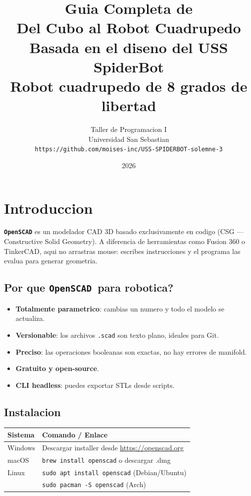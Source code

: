 \documentclass[12pt, oneside, a4paper]{report}
\title{
    \vspace{3cm}
    {\Huge\bfseries Guia Completa de \openscadlogo\\[0.5cm]
    \large Del Cubo al Robot Cuadrupedo}\\[1.5cm]
    {\large Basada en el diseno del \textbf{USS SpiderBot}}\\[0.5cm]
    {\large Robot cuadrupedo de 8 grados de libertad}\\[2cm]
}
\author{
    Taller de Programacion I\\
    Universidad San Sebastian\\
    \texttt{https://github.com/moises-inc/USS-SPIDERBOT-solemne-3}
}
\date{2026}
\newcommand{\openscadlogo}{\texttt{OpenSCAD}}
\newcommand{\codigo}[1]{\texttt{#1}}
\begin{document}
\maketitle
\thispagestyle{empty}
\newpage

\tableofcontents
\newpage

\chapter*{Introduccion}

\textbf{\openscadlogo} es un modelador CAD 3D basado exclusivamente en codigo (CSG --- Constructive Solid Geometry). A diferencia de herramientas como Fusion 360 o TinkerCAD, aqui no arrastras mouse: escribes instrucciones y el programa las evalua para generar geometria.

\section*{Por que \openscadlogo\ para robotica?}
\begin{itemize}
    \item \textbf{Totalmente parametrico}: cambias un numero y todo el modelo se actualiza.
    \item \textbf{Versionable}: los archivos \codigo{.scad} son texto plano, ideales para Git.
    \item \textbf{Preciso}: las operaciones booleanas son exactas, no hay errores de manifold.
    \item \textbf{Gratuito y open-source}.
    \item \textbf{CLI headless}: puedes exportar STLs desde scripts.
\end{itemize}

\section*{Instalacion}
\begin{center}
\begin{tabular}{ll}
\toprule
Sistema & Comando / Enlace \\
\midrule
Windows & Descargar installer desde \url{https://openscad.org} \\
macOS   & \codigo{brew install openscad} o descargar .dmg \\
Linux   & \codigo{sudo apt install openscad} (Debian/Ubuntu) \\
        & \codigo{sudo pacman -S openscad} (Arch) \\
\bottomrule
\end{tabular}
\end{center}
\end{document}
